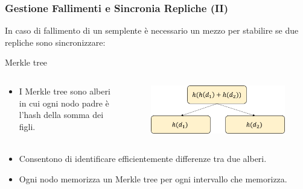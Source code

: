 \begin{frame}
  \frametitle{Gestione Fallimenti e Sincronia Repliche (II)}
    In caso di fallimento di un semplente è necessario un mezzo per stabilire se due repliche sono sincronizzare:
    \begin{block}{Merkle tree}
    \begin{columns}
    \begin{column}{0.4\textwidth}
      \begin{itemize}
      \item I \alert{Merkle tree} sono alberi in cui ogni nodo padre è l'hash della somma dei figli.
      \end{itemize}
      \end{column}
      \begin{column}{0.5\textwidth}
        \begin{figure}
        \centering
        \includegraphics[scale=0.4]{dynamo/merkle-tree.png}
        \end{figure}
      \end{column}
    \end{columns}
    \begin{itemize}
      \item Consentono di identificare efficientemente differenze tra due alberi.
      \item Ogni nodo memorizza un Merkle tree per ogni intervallo che memorizza.
    \end{itemize}
  \end{block}
\end{frame}


